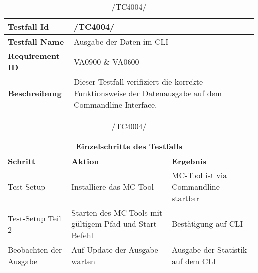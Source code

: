 \begin{table}[h]
\caption{/TC4004/}
\label{tab:TC4004}
\begin{center}
\begin{tabular}{|p{3.5cm}|p{9cm}|}
\hline
\textbf{Testfall Id} & /TC4004/\\
\hline
\textbf{Testfall Name} & Ausgabe der Daten im CLI\\
\hline
\textbf{Requirement ID} & VA0900 \& VA0600\\
\hline
\textbf{Beschreibung} & Dieser Testfall verifiziert die korrekte
Funktionsweise der Datenausgabe auf dem Commandline Interface.\\
\hline
\end{tabular}
\begin{tabular}{|p{2.5cm}|p{5cm}|p{4.55cm}|}
\multicolumn{3}{|c|}{\textbf{Einzelschritte des Testfalls}} \\
\hline
\textbf{Schritt} & \textbf{Aktion} & \textbf{Ergebnis}\\
\hline
Test-Setup & Installiere das MC-Tool & MC-Tool ist via
Commandline startbar\\
\hline
Test-Setup Teil 2 & Starten des MC-Tools mit gültigem Pfad und Start-Befehl &
Bestätigung auf CLI\\
\hline
Beobachten der Ausgabe & Auf Update der Ausgabe warten & Ausgabe der Statistik
auf dem CLI
\\
\hline
\end{tabular}
\end{center}
\label{default}
\end{table}

